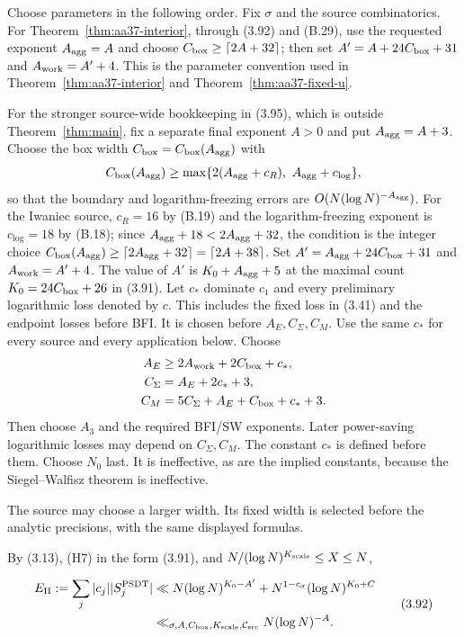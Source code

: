 Choose parameters in the following order.
Fix $\sigma$ and the source combinatorics.
For Theorem~\ref{thm:aa37-interior}, through (3.92) and (B.29), use
the requested exponent $A_{\rm agg}=A$ and choose
$C_{\rm box}\ge\lceil2A+32\rceil$; then set
$A'=A+24C_{\rm box}+31$ and $A_{\rm work}=A'+4$.
This is the parameter convention used in Theorem~\ref{thm:aa37-interior}
and Theorem~\ref{thm:aa37-fixed-u}.

For the stronger source-wide bookkeeping in (3.95), which is outside
Theorem~\ref{thm:main}, fix a separate final exponent $A>0$ and put
$A_{\rm agg}=A+3$.
Choose the box width $C_{\rm box}=C_{\rm box}(A_{\rm agg})$ with
\[
 C_{\rm box}(A_{\rm agg})\ge
 \max\{2(A_{\rm agg}+c_R),\ A_{\rm agg}+c_{\log}\},
\]
so that the boundary and logarithm-freezing errors are
$O(N(\log N)^{-A_{\rm agg}})$. For the Iwaniec source,
$c_R=16$ by (B.19) and the logarithm-freezing exponent is
$c_{\log}=18$ by (B.18); since
$A_{\rm agg}+18<2A_{\rm agg}+32$, the condition is the integer choice
$C_{\rm box}(A_{\rm agg})\ge\lceil2A_{\rm agg}+32\rceil
=\lceil2A+38\rceil$. Set
$A'=A_{\rm agg}+24C_{\rm box}+31$ and $A_{\rm work}=A'+4$.
The value of $A'$ is $K_0+A_{\rm agg}+5$ at the maximal count
$K_0=24C_{\rm box}+26$ in (3.91).
Let $c_*$ dominate $c_1$ and every preliminary logarithmic loss denoted by $c$.
This includes the fixed loss in (3.41) and the endpoint losses before BFI.
It is chosen before $A_E,C_\Sigma,C_M$.
Use the same $c_*$ for every source and every application below.
Choose
\[
\begin{aligned}
 A_E&\ge2A_{\rm work}+2C_{\rm box}+c_*,\\
 C_\Sigma&=A_E+2c_*+3,\\
 C_M&=5C_\Sigma+A_E+C_{\rm box}+c_*+3.
\end{aligned}
\]
Then choose $A_3$ and the required BFI/SW exponents.
Later power-saving logarithmic losses may depend on $C_\Sigma,C_M$.
The constant $c_*$ is defined before them.
Choose $N_0$ last. It is ineffective, as are the implied constants,
because the Siegel--Walfisz theorem is ineffective.

The source may choose a larger width. Its fixed width is selected
before the analytic precisions, with the same displayed formulas.

By (3.13), (H7) in the form (3.91), and $N/(\log N)^{K_{\rm scale}}\le X\le N$,

\[
\begin{aligned}
E_{\rm II}:=\sum_j|c_j||S_j^{\rm PSDT}|
&\ll N(\log N)^{K_0-A'}
 +N^{1-c_\sigma}(\log N)^{K_0+C}\\
&\ll_{\sigma,A,C_{\rm box},K_{\rm scale},\mathcal C_{\rm src}}
N(\log N)^{-A}.
\end{aligned}
\tag{3.92}
\]

